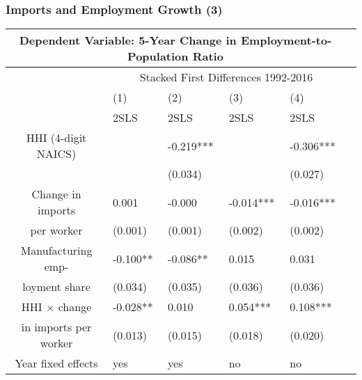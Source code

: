 \documentclass[11pt]{beamer}
\begin{document}
\begin{frame}
\frametitle{Imports and Employment Growth (3)}
\begin{table}
  \centering 
    {\tiny \begin{tabularx}{1.0\textwidth}{ c *{5}{X} }
    \toprule
    \multicolumn{5}{c}{Dependent Variable: 5-Year Change in Employment-to-Population Ratio} \\
    \midrule
    & \multicolumn{4}{c}{Stacked First Differences 1992-2016}\\
    \cmidrule{2-5}
    & (1) & (2) & (3) & (4) \\
    & 2SLS & 2SLS & 2SLS & 2SLS \\
    \midrule
HHI (4-digit NAICS)& & -0.219*** &  & -0.306*** \\
			      & & (0.034) &  & (0.027) \\
\midrule
Change in imports & 0.001 & -0.000 & -0.014*** & -0.016*** \\
per worker	     & (0.001) & (0.001) & (0.002) & (0.002) \\
\midrule
Manufacturing emp- & -0.100** & -0.086** & 0.015 & 0.031 \\
loyment share & (0.034) & (0.035) & (0.036) & (0.036) \\
\midrule
HHI $\times$ change & -0.028** & 0.010& 0.054***& 0.108***\\
 in imports per worker & (0.013) & (0.015) & (0.018) & (0.020) \\
 \midrule
 Year fixed effects & yes & yes & no & no \\
 \bottomrule
    \end{tabularx}}
\end{table}
\end{frame}
\end{document}
